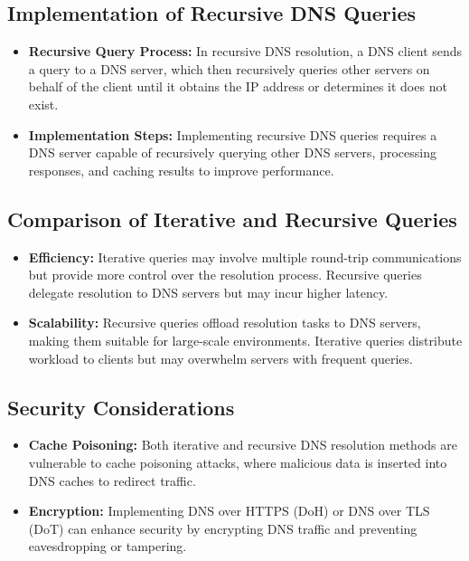 \documentclass[11pt]{article}
\begin{document}
\subsection{Implementation of Recursive DNS Queries}

\begin{itemize}
\item \textbf{Recursive Query Process:} In recursive DNS resolution, a DNS client sends a query to a DNS server, which then recursively queries other servers on behalf of the client until it obtains the IP address or determines it does not exist.
\item \textbf{Implementation Steps:} Implementing recursive DNS queries requires a DNS server capable of recursively querying other DNS servers, processing responses, and caching results to improve performance.
\end{itemize}

\subsection{Comparison of Iterative and Recursive Queries}

\begin{itemize}
\item \textbf{Efficiency:} Iterative queries may involve multiple round-trip communications but provide more control over the resolution process. Recursive queries delegate resolution to DNS servers but may incur higher latency.
\item \textbf{Scalability:} Recursive queries offload resolution tasks to DNS servers, making them suitable for large-scale environments. Iterative queries distribute workload to clients but may overwhelm servers with frequent queries.
\end{itemize}

\subsection{Security Considerations}

\begin{itemize}
\item \textbf{Cache Poisoning:} Both iterative and recursive DNS resolution methods are vulnerable to cache poisoning attacks, where malicious data is inserted into DNS caches to redirect traffic.
\item \textbf{Encryption:} Implementing DNS over HTTPS (DoH) or DNS over TLS (DoT) can enhance security by encrypting DNS traffic and preventing eavesdropping or tampering.
\end{itemize}
\end{document}
